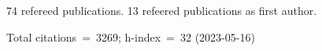 74 refereed publications. 13 refeered publications as first author.

Total citations~=~3269; h-index~=~32 (2023-05-16)